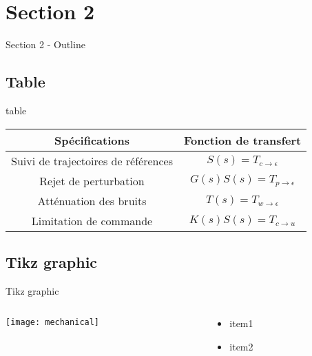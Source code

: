 \documentclass[../main/main.tex]{subfiles}
\begin{document}
\onlyinsubfile{%

}

\section{Section 2}%

\begin{frame}{Section 2 - Outline}
\end{frame}


\subsection{Table}%

\begin{frame}{table}
    \begin{tabular}{| c | c |}
        \hline
        Spécifications                      & Fonction de transfert                    \\ \hline
        Suivi de trajectoires de références & $S(s) = T_{c \rightarrow \epsilon}$      \\ \hline
        Rejet de perturbation               & $G(s) S(s) = T_{p \rightarrow \epsilon}$ \\ \hline
        Atténuation des bruits              & $T(s) = T_{w \rightarrow \epsilon}$      \\ \hline
        Limitation de commande              & $K(s) S(s) = T_{c \rightarrow u}$        \\ \hline
    \end{tabular}
\end{frame}

\subsection{Tikz graphic}%

\begin{frame}{Tikz graphic}
    \begin{columns}[c]
        \begin{column}{0.6\textwidth}
            \centering
            \texttt{[image: mechanical]}
        \end{column}
        \begin{column}{0.4\textwidth}
            \centering
            \begin{itemize}
                \item item1
                \item item2
            \end{itemize}
        \end{column}
    \end{columns}
\end{frame}
\end{document}
